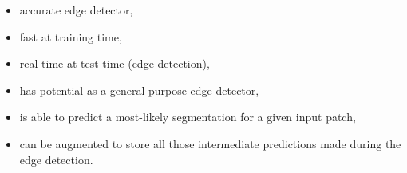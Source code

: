 \begin{itemize}
 \item accurate edge detector,
 \item fast at training time,
 \item real time at test time (edge detection),
 \item has potential as a general-purpose edge detector, %
 \item is able to predict a most-likely segmentation for a given input patch,
 \item can be augmented to store all those intermediate predictions made during the edge detection.
\end{itemize}

